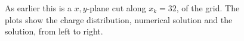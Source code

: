 \begin{figure}
\begin{subfigure}[b]{0.32\textwidth}
			\end{subfigure}
			\caption{As earlier this is a \(x,y\)-plane cut along \(x_k=32\), of the grid. The plots show the charge distribution,
			numerical solution and the solution, from left to right.}
			\label{fig:random}
		\end{figure}
